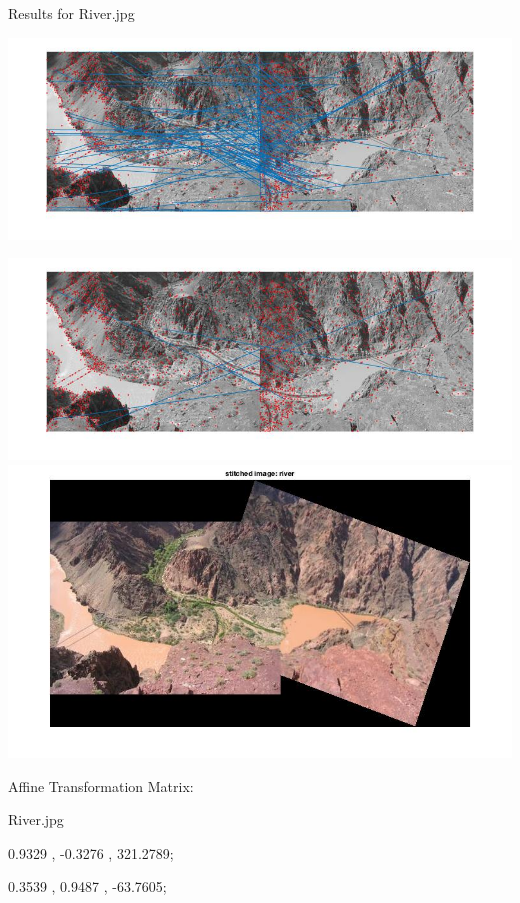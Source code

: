 \documentclass[fleqn]{article}
\begin{document}
Results for River.jpg
\begin{center}
\includegraphics[width=1.2\textwidth]{river1.jpg}

\includegraphics[width=1.2\textwidth]{river2.jpg}
\newline
\includegraphics[width=1.2\textwidth]{river3.jpg}

Affine Transformation Matrix:
\vspace{10 mm}

River.jpg

0.9329   ,   -0.3276    ,    321.2789;

0.3539   ,   0.9487   ,  -63.7605;

\end{center}

\newpage
\end{document}
